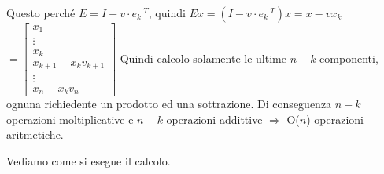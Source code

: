 \documentclass[10pt]{book}
\begin{document}
\begin{enumerate}
	 Questo perché $E = I - v\cdot e_k\,^T$, quindi $Ex = (I - v\cdot e_k\,^T)x = x - v x_k$\\
	 \begin{math}
	 	= \left[ \begin{array}{c}
	 	x_1\\\vdots\\x_k\\x_{k+1} - x_k v_{k+1}\\\vdots\\ x_n - x_k v_n
	 	\end{array} \right]
	 \end{math}
	 Quindi calcolo solamente le ultime $n-k$ componenti, ognuna richiedente un prodotto ed una sottrazione. Di conseguenza $n-k$ operazioni moltiplicative e $n-k$ operazioni addittive $\Rightarrow$ O($n$) operazioni aritmetiche.
\end{enumerate}
Vediamo come si esegue il calcolo.
\end{document}
